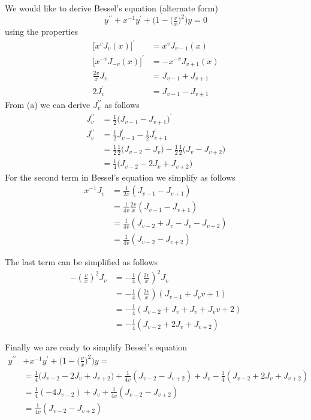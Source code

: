 \documentclass[12pt]{article}
\begin{document}
	We would like to derive Bessel's equation (alternate form) 
	$$
	y^{\prime\prime} + x^{-1}y^\prime + \Big(1-\big(\tfrac{v}{x}\big)^2\Big) y = 0
	$$
	using the properties
	\begin{align}
		\Big[x^vJ_v(x)\Big]^\prime & = x^vJ_{v-1}(x) \tag{a}\\
		\Big[x^{-v}J_{-v}(x)\Big]^\prime & = -x^{-v}J_{v+1}(x)	\tag{b} \\
		\tfrac{2v}{x}J_v & = J_	{v-1} + J_	{v+1} \tag{c} \\
		2J_v^\prime & = J_{v-1} - J_{v+1} \tag{d}
	\end{align}
	From (a) we can derive $J_v^{\prime\prime}$ as follows
	\begin{align*}
		J_v^{\prime\prime} & = \tfrac{1}{2}\big(J_{v-1} - J_{v+1}\big)^\prime \\
		J_v^{\prime\prime} & = \tfrac{1}{2} J_{v-1}^\prime - \tfrac{1}{2} J_{v+1}^\prime \\
		& = \tfrac{1}{2} \tfrac{1}{2}\big(J_{v-2} - J_{v}\big) - \tfrac{1}{2} \tfrac{1}{2}\big(J_{v} - J_{v+2}\big) \\
		& = \tfrac{1}{4} \big(J_{v-2} - 2J_v + J_{v+2}\big)
	\end{align*}
	For the second term in Bessel's equation we simplify as follows
	\begin{align*}
		x^{-1}J_v & = \tfrac{1}{2x} (J_{v-1} - J_{v+1}) \\
		& = \tfrac{1}{4v} \tfrac{2v}{x}(J_{v-1} - J_{v+1}) \\
		& = \tfrac{1}{4v} (J_{v-2} + J_v -J_v - J_{v+2}) \\
		& = \tfrac{1}{4v} (J_{v-2} - J_{v+2})
	\end{align*}
	
	The last term can be simplified as follows
	\begin{align*}
		-(\tfrac{v}{x} )^2J_v & = - \tfrac{1}{4} (\tfrac{2v}{x} )^2J_v \\
		& = - \tfrac{1}{4} (\tfrac{2v}{x})(J_{v-1} + J_v{v+1}) \\
		& = - \tfrac{1}{4} (J_{v-2} + J_{v} + J_{v} + J_v{v+2}) \\
		& = - \tfrac{1}{4} (J_{v-2} + 2J_{v}+ J_{v+2})
	\end{align*}
	
	Finally we are ready to simplify Bessel's equation
	\begin{align*}
		y^{\prime\prime} & + x^{-1}y^\prime + \Big(1-\big(\tfrac{v}{x}\big)^2\Big) y = \\
		& = \tfrac{1}{4} \big(J_{v-2} - 2J_v + J_{v+2}\big) + \tfrac{1}{4v} (J_{v-2} - J_{v+2}) + J_v - \tfrac{1}{4} (J_{v-2} + 2J_{v}+ J_{v+2}) \\
		& = \tfrac{1}{4}(-4J_{v-2}) + J_v + \tfrac{1}{4v} (J_{v-2} - J_{v+2}) \\
		& = \tfrac{1}{4v} (J_{v-2} - J_{v+2})
	\end{align*}
	
\end{document}
